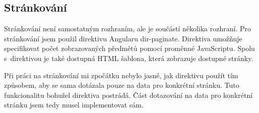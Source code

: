 \documentclass[thesis=M,czech]{FITthesis}[2012/06/26]
\begin{document}




    \subsection{Stránkování}
     
      Stránkování není samostatným rozhraním, ale je součástí několika rozhraní.
      Pro stránkování jsem použil direktivu Angularu dir-paginate.
      Direktiva umožňuje specifikovat počet zobrazovaných předmětů pomocí proměnné JavaScriptu.
      Spolu s~direktivou je také dostupná HTML
      šablona, která zobrazuje dostupné stránky.

      Při práci na stránkování mi zpočátku nebylo jasné, jak direktivu použít tím způsobem,
      aby se sama dotázala pouze na data pro konkrétní stránku.
      Tuto funkcionalitu bohužel direktiva postrádá.
      Část dotazování na data pro konkrétní stránku jsem tedy musel implementovat sám.
\end{document}
